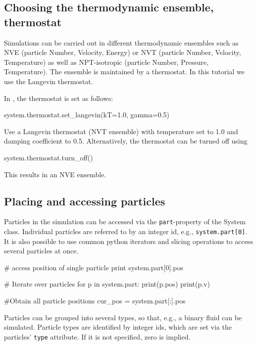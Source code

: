 \documentclass[
paper=a4,                       %
fontsize=11pt,                  %
twoside,                        %
footsepline,                    %
headsepline,                    %
headinclude=false,              %
footinclude=false,              %
pagesize,                       %
]{scrartcl}
\begin{document}
\subsection{Choosing the thermodynamic ensemble, thermostat}
Simulations can be carried out in different thermodynamic ensembles such as NVE (particle
Number, Velocity, Energy) or NVT (particle Number, Velocity, Temperature)
as well as NPT-isotropic (particle Number, Pressure, Temperature). 
The ensemble is maintained by a thermostat. In this tutorial we use the Langevin thermostat.

In \es{}, the thermostat is set as follows:
{\small\vspace{0,2cm}
\begin{pypresso}
system.thermostat.set_langevin(kT=1.0, gamma=0.5)
\end{pypresso}}\vspace{0,2cm}
\noindent Use a Langevin thermostat (NVT ensemble) with temperature set to 1.0 and damping coefficient to 0.5. Alternatively, the thermostat can be turned off using
{\small\vspace{0,2cm}
\begin{pypresso}
system.thermostat.turn_off()
\end{pypresso}}\vspace{0,2cm}
\noindent This results in an NVE ensemble.


\subsection{Placing and accessing particles}

Particles in the simulation can be accessed via the \texttt{part}-property of the System class. Individual particles are referred to by an integer id, e.g., \texttt{system.part[0]}. It is also possible to use common python iterators and slicing operations to access several particles at once.
\begin{pypresso}
# access position of single particle
print system.part[0].pos

# Iterate over particles
for p in system.part:
    print(p.pos)
    print(p.v)

#Obtain all particle positions
cur_pos = system.part[:].pos
\end{pypresso}
Particles can be grouped into several types, so that, e.g., a binary fluid can be simulated. Particle types are identified by integer ids, which are set via the particles' \texttt{type} attribute. If it is not specified, zero is implied.
\end{document}
